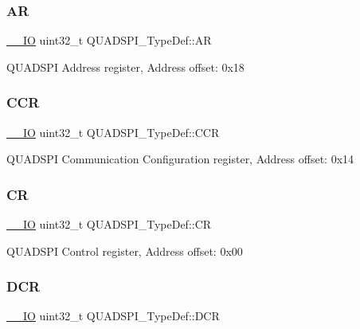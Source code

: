 \subsubsection{\texorpdfstring{AR}{AR}}
{\footnotesize\ttfamily \mbox{\hyperlink{core__sc300_8h_aec43007d9998a0a0e01faede4133d6be}{\+\_\+\+\_\+\+IO}} uint32\+\_\+t Q\+U\+A\+D\+S\+P\+I\+\_\+\+Type\+Def\+::\+AR}

Q\+U\+A\+D\+S\+PI Address register, Address offset\+: 0x18 \mbox{\label{struct_q_u_a_d_s_p_i___type_def_aa2e69474978a87b7a24b4b0e4da3c673}} 
\subsubsection{\texorpdfstring{CCR}{CCR}}
{\footnotesize\ttfamily \mbox{\hyperlink{core__sc300_8h_aec43007d9998a0a0e01faede4133d6be}{\+\_\+\+\_\+\+IO}} uint32\+\_\+t Q\+U\+A\+D\+S\+P\+I\+\_\+\+Type\+Def\+::\+C\+CR}

Q\+U\+A\+D\+S\+PI Communication Configuration register, Address offset\+: 0x14 \mbox{\label{struct_q_u_a_d_s_p_i___type_def_ad6a1c5cd7b36de02e3969fb9c469beea}} 
\subsubsection{\texorpdfstring{CR}{CR}}
{\footnotesize\ttfamily \mbox{\hyperlink{core__sc300_8h_aec43007d9998a0a0e01faede4133d6be}{\+\_\+\+\_\+\+IO}} uint32\+\_\+t Q\+U\+A\+D\+S\+P\+I\+\_\+\+Type\+Def\+::\+CR}

Q\+U\+A\+D\+S\+PI Control register, Address offset\+: 0x00 \mbox{\label{struct_q_u_a_d_s_p_i___type_def_a8901a4df6a4d50b741c4544290cbee04}} 
\subsubsection{\texorpdfstring{DCR}{DCR}}
{\footnotesize\ttfamily \mbox{\hyperlink{core__sc300_8h_aec43007d9998a0a0e01faede4133d6be}{\+\_\+\+\_\+\+IO}} uint32\+\_\+t Q\+U\+A\+D\+S\+P\+I\+\_\+\+Type\+Def\+::\+D\+CR}

